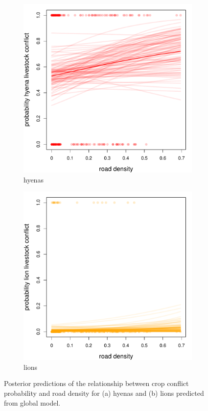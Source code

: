 \documentclass[12pt,]{article}
\begin{document}
\begin{figure}[H]
  \centering
	\begin{subfigure}[b]{0.49\textwidth}
	\includegraphics[width=\textwidth]{Figures/road_livestock_global_conflict_hyena.pdf} 
    \caption{hyenas}
   	    \label{fig:cropRDhyena}
\end{subfigure}
\begin{subfigure}[b]{0.49\textwidth}
	\includegraphics[width=\textwidth]{Figures/road_livestock_global_conflict_lion.pdf}  
    \caption{lions}
  	\label{fig:cropRDleo}
\end{subfigure}
\caption{Posterior predictions of the relationship between crop conflict probability and road density for (a) hyenas and (b) lions predicted from global model.}
\end{figure}
\end{document}

